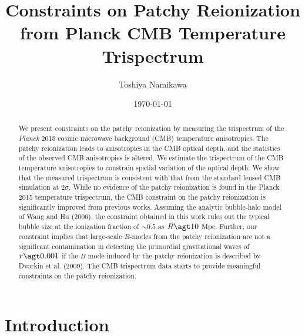 \documentclass[aps,prd,twocolumn,superscriptaddress,groupedaddress,nofootinbib]{revtex4}
\begin{document}
\title{Constraints on Patchy Reionization from Planck CMB Temperature Trispectrum}

\author{Toshiya Namikawa}

\date{\today}

\begin{abstract}
We present constraints on the patchy reionization by measuring the trispectrum of 
the {\it Planck} 2015 cosmic microwave background (CMB) temperature anisotropies. 
The patchy reionization leads to anisotropies in the CMB optical depth, and 
the statistics of the observed CMB anisotropies is altered. 
We estimate the trispectrum of the CMB temperature anisotropies to constrain spatial variation of the optical depth.
We show that the measured trispectrum is consistent with that from the standard lensed CMB simulation at $2\sigma$.
While no evidence of the patchy reionization is found in the Planck 2015 temperature trispectrum, 
the CMB constraint on the patchy reionization is significantly improved from previous works. 
Assuming the analytic bubble-halo model of Wang and Hu (2006), the constraint obtained in this work rules out
the typical bubble size at the ionization fraction of $\sim0.5$ as $R\agt 10$ Mpc.
Further, our constraint implies that large-scale $B$-modes from the patchy reionization are not a significant 
contamination in detecting the primordial gravitational waves of $r\agt0.001$ 
if the $B$ mode induced by the patchy reionization is described by Dvorkin et al. (2009).
The CMB trispectrum data starts to provide meaningful constraints on the patchy reionization. 
\end{abstract}

\maketitle


\section{Introduction} \label{intro}
\end{document}
